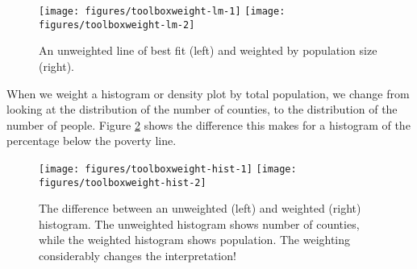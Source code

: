 \begin{Shaded}
\begin{Highlighting}[]
\StringTok{ }\NormalTok{(}  \NormalTok{)}
 \StringTok{ }
 
    \StringTok{ }
\end{Highlighting}
\end{Shaded}

\begin{figure}

{\centering \texttt{[image: figures/toolboxweight-lm-1]} \texttt{[image: figures/toolboxweight-lm-2]} 

}

\caption{An unweighted line of best fit (left) and weighted by population size (right).\label{fig:weight-lm}}
\end{figure}

When we weight a histogram or density plot by total population, we
change from looking at the distribution of the number of counties, to
the distribution of the number of people. Figure \ref{fig:weight-hist}
shows the difference this makes for a histogram of the percentage below
the poverty line. 

\begin{Shaded}
\begin{Highlighting}[]
  \NormalTok{)}
  
   \NormalTok{) +}\StringTok{ }\NormalTok{(}\NormalTok{)}
\end{Highlighting}
\end{Shaded}

\begin{figure}

{\centering \texttt{[image: figures/toolboxweight-hist-1]} \texttt{[image: figures/toolboxweight-hist-2]} 

}

\caption{The difference between an unweighted (left) and weighted (right) histogram. The unweighted histogram shows number of counties, while the weighted histogram shows population. The weighting considerably changes the interpretation!\label{fig:weight-hist}}
\end{figure}

